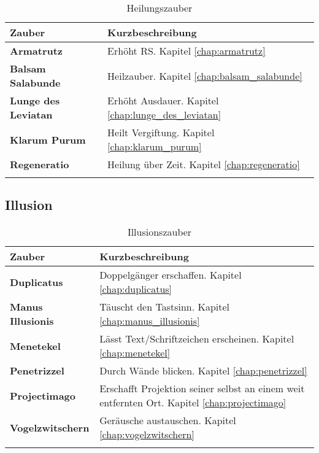\begin{longtable}{|p{5cm}|p{10cm}|}
\hline
\textbf{Zauber} & \textbf{Kurzbeschreibung} \\ \hline

\textbf{Armatrutz} & Erhöht RS. Kapitel \ref{chap:armatrutz} \\ \hline

\textbf{Balsam Salabunde} & Heilzauber. Kapitel \ref{chap:balsam_salabunde} \\ \hline

\textbf{Lunge des Leviatan} & Erhöht Ausdauer. Kapitel \ref{chap:lunge_des_leviatan} \\ \hline

\textbf{Klarum Purum} & Heilt Vergiftung. Kapitel \ref{chap:klarum_purum} \\ \hline

\textbf{Regeneratio} & Heilung über Zeit. Kapitel \ref{chap:regeneratio} \\ \hline

\caption{Heilungszauber}
\label{tab:heilungszauber}
\end{longtable}


\subsection{Illusion}
\begin{longtable}{|p{5cm}|p{10cm}|}
\hline
\textbf{Zauber} & \textbf{Kurzbeschreibung} \\ \hline

\textbf{Duplicatus} & Doppelgänger erschaffen. Kapitel \ref{chap:duplicatus} \\ \hline

\textbf{Manus Illusionis} & Täuscht den Tastsinn. Kapitel \ref{chap:manus_illusionis} \\ \hline

\textbf{Menetekel} & Lässt Text/Schriftzeichen erscheinen. Kapitel \ref{chap:menetekel} \\ \hline

\textbf{Penetrizzel} & Durch Wände blicken. Kapitel \ref{chap:penetrizzel} \\ \hline

\textbf{Projectimago} & Erschafft Projektion seiner selbst an einem weit entfernten Ort. Kapitel \ref{chap:projectimago} \\ \hline

\textbf{Vogelzwitschern} & Geräusche austauschen. Kapitel \ref{chap:vogelzwitschern} \\ \hline

\caption{Illusionszauber}
\label{tab:illusionszauber}
\end{longtable}



